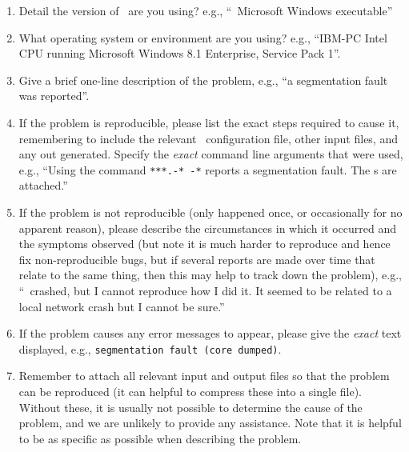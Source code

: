 \begin{enumerate}
\item Detail the version of \CNAME\ are you using? e.g., ``\CNAME\ \VER Microsoft Windows executable''

\item What operating system or environment are you using? e.g., ``IBM-PC Intel CPU running Microsoft Windows 8.1 Enterprise, Service Pack 1''.

\item Give a brief one-line description of the problem, e.g., ``a segmentation fault was reported''.

\item If the problem is reproducible, please list the exact steps required to cause it, remembering to include the relevant \CNAME\ configuration file, other input files, and any out generated. Specify the \emph{exact} command line arguments that were used, e.g., ``Using the command \texttt{***.-* -*} reports a segmentation fault. The \config s are attached.''

\item If the problem is not reproducible (only happened once, or occasionally for no apparent reason), please describe the circumstances in which it occurred and the symptoms observed (but note it is much harder to reproduce and hence fix non-reproducible bugs, but if several reports are made over time that relate to the same thing, then this may help to track down the problem), e.g., ``\CNAME\ crashed, but I cannot reproduce how I did it. It seemed to be related to a local network crash but I cannot be sure.''

\item If the problem causes any error messages to appear, please give the \emph{exact} text displayed, e.g., \texttt{segmentation fault (core dumped)}.

\item Remember to attach all relevant input and output files so that the problem can be reproduced (it can helpful to compress these into a single file). Without these, it is usually not possible to determine the cause of the problem, and we are unlikely to provide any assistance. Note that it is helpful to be as specific as possible when describing the problem.

\end{enumerate}
